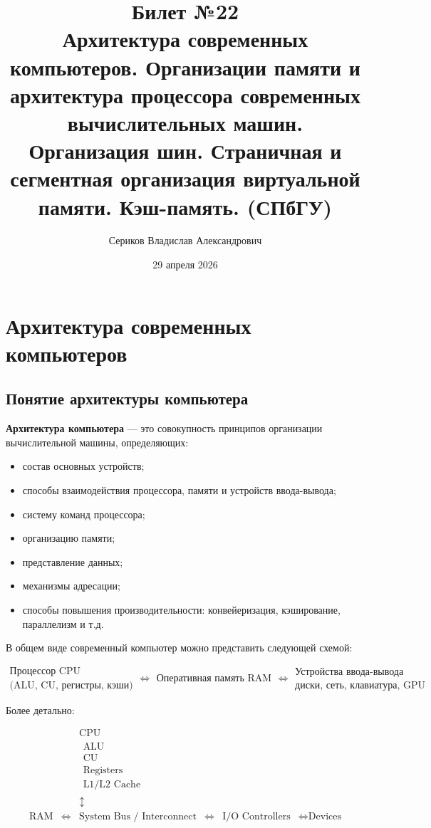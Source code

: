 \documentclass[12pt,a4paper]{article}
\title{Билет №22 \\ \small Архитектура современных компьютеров. Организации памяти и архитектура процессора современных вычислительных машин. Организация шин. Страничная и сегментная организация виртуальной памяти. Кэш-память. (СПбГУ)}
\author{Сериков Владислав Александрович}
\date{29 апреля 2026}
\theoremstyle{remark}
\begin{document}
\maketitle
\tableofcontents
\newpage

\section{Архитектура современных компьютеров}

\subsection{Понятие архитектуры компьютера}

\textbf{Архитектура компьютера} --- это совокупность принципов организации вычислительной машины, определяющих:
\begin{itemize}
    \item состав основных устройств;
    \item способы взаимодействия процессора, памяти и устройств ввода-вывода;
    \item систему команд процессора;
    \item организацию памяти;
    \item представление данных;
    \item механизмы адресации;
    \item способы повышения производительности: конвейеризация, кэширование, параллелизм и т.д.
\end{itemize}

В общем виде современный компьютер можно представить следующей схемой:

\[
\boxed{
\begin{array}{c}
\text{Процессор CPU} \\
\text{(ALU, CU, регистры, кэши)}
\end{array}}
\Longleftrightarrow
\boxed{
\begin{array}{c}
\text{Оперативная память RAM}
\end{array}}
\Longleftrightarrow
\boxed{
\begin{array}{c}
\text{Устройства ввода-вывода} \\
\text{диски, сеть, клавиатура, GPU}
\end{array}}
\]

Более детально:

\[
\begin{array}{cccccc}
 & & \boxed{\text{CPU}} & & & \\
 & & \begin{array}{c}
        \text{ALU} \\
        \text{CU} \\
        \text{Registers} \\
        \text{L1/L2 Cache}
      \end{array}
 & & & \\
 & & \updownarrow & & & \\
\boxed{\text{RAM}} & \Longleftrightarrow & \boxed{\text{System Bus / Interconnect}}
& \Longleftrightarrow & \boxed{\text{I/O Controllers}} & \Longleftrightarrow \boxed{\text{Devices}}
\end{array}
\]
\end{document}
